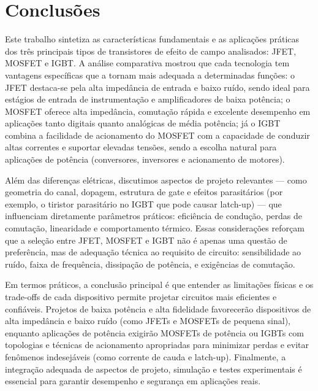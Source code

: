 \documentclass[12pt]{article}
\begin{document}
\section{Conclusões}
    Este trabalho sintetiza as características fundamentais e as aplicações práticas dos três principais tipos de transistores de efeito de campo analisados: JFET, MOSFET e IGBT. A análise comparativa mostrou que cada tecnologia tem vantagens específicas que a tornam mais adequada a determinadas funções: o JFET destaca-se pela alta impedância de entrada e baixo ruído, sendo ideal para estágios de entrada de instrumentação e amplificadores de baixa potência; o MOSFET oferece alta impedância, comutação rápida e excelente desempenho em aplicações tanto digitais quanto analógicas de média potência; já o IGBT combina a facilidade de acionamento do MOSFET com a capacidade de conduzir altas correntes e suportar elevadas tensões, sendo a escolha natural para aplicações de potência (conversores, inversores e acionamento de motores).

    Além das diferenças elétricas, discutimos aspectos de projeto relevantes — como geometria do canal, dopagem, estrutura de gate e efeitos parasitários (por exemplo, o tiristor parasitário no IGBT que pode causar latch-up) — que influenciam diretamente parâmetros práticos: eficiência de condução, perdas de comutação, linearidade e comportamento térmico. Essas considerações reforçam que a seleção entre JFET, MOSFET e IGBT não é apenas uma questão de preferência, mas de adequação técnica ao requisito de circuito: sensibilidade ao ruído, faixa de frequência, dissipação de potência, e exigências de comutação.
    
    Em termos práticos, a conclusão principal é que entender as limitações físicas e os trade-offs de cada dispositivo permite projetar circuitos mais eficientes e confiáveis. Projetos de baixa potência e alta fidelidade favorecerão dispositivos de alta impedância e baixo ruído (como JFETs e MOSFETs de pequena sinal), enquanto aplicações de potência exigirão MOSFETs de potência ou IGBTs com topologias e técnicas de acionamento apropriadas para minimizar perdas e evitar fenômenos indesejáveis (como corrente de cauda e latch-up). Finalmente, a integração adequada de aspectos de projeto, simulação e testes experimentais é essencial para garantir desempenho e segurança em aplicações reais.

\newpage


\end{document}
